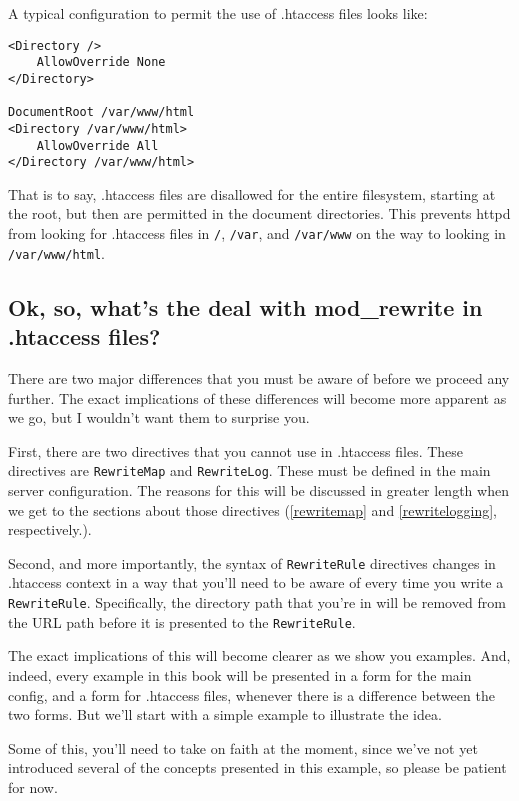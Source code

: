 A typical configuration to permit the use of .htaccess files looks like:

\begin{verbatim}
<Directory />
	AllowOverride None
</Directory>

DocumentRoot /var/www/html
<Directory /var/www/html>
	AllowOverride All
</Directory /var/www/html>
\end{verbatim}

That is to say, .htaccess files are disallowed for the entire filesystem, 
starting at the root, but then are permitted in the document directories.
This prevents httpd from looking for .htaccess files in \verb~/~, \verb~/var~, 
and \verb~/var/www~ on the way to looking in \verb~/var/www/html~.

\subsection{Ok, so, what's the deal with mod\_rewrite in .htaccess files?}

There are two major differences that you must be aware of before we proceed any further. The exact implications of these differences will become more apparent as we go, but I wouldn't want them to surprise you.

First, there are two directives that you cannot use in .htaccess files. These directives are \verb~RewriteMap~ and \verb~RewriteLog~. These must be defined in the main server configuration. The reasons for this will be discussed in greater length when we get to the sections about those directives (\ref{rewritemap} and \ref{rewritelogging}, respectively.).

Second, and more importantly, the syntax of \verb~RewriteRule~ directives changes in .htaccess context in a way that you'll need to be aware of every time you write a \verb~RewriteRule~. Specifically, the directory path that you're in will be removed from the URL path before it is presented to the \verb~RewriteRule~.

The exact implications of this will become clearer as we show you examples. And, indeed, every example in this book will be presented in a form for the main config, and a form for .htaccess files, whenever there is a difference between the two forms. But we'll start with a simple example to illustrate the idea.

Some of this, you'll need to take on faith at the moment, since we've not yet introduced several of the concepts presented in this example, so please be patient for now.

